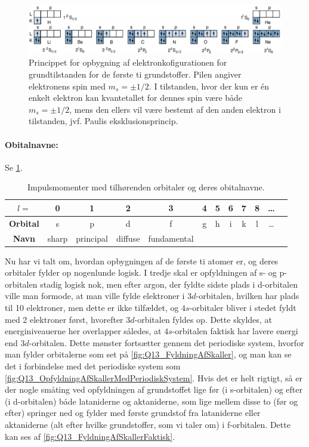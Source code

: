 \begin{figure}[!h]
    \centering
    \includegraphics[width=\textwidth]{Q13/images/FirstTwoShellsElectronicSpinConfiguration.PNG}
    \caption{Princippet for opbygning af elektronkofigurationen for grundtilstanden for de første ti grundstoffer. Pilen angiver elektronens spin med $m_s = \pm 1/2$. I tilstanden, hvor der kun er én enkelt elektron kan kvantetallet for dennes spin være både $m_s = \pm 1/2$, mens den ellers vil være bestemt af den anden elektron i tilstanden, jvf. Paulis eksklusionsprincip.}
    \label{fig:Q13_FyldningAfDeInderstseToSkaller}
\end{figure}

\paragraph{Obitalnavne:} Se \cref{tab:Q13_ImpulsmomenterOrbitalerOgDeresNavne}.
\begin{table}[!h]
    \centering
    \begin{tabular}{|c|c|c|c|c|c|c|c|c|c|c|c|}
        \hline
        $l=$ & 0 & 1 & 2 & 3 & 4 & 5 & 6 & 7 & 8 & \ldots\\
        \hline
        \textbf{Orbital} & s & p & d & f & g & h & i & k & l & \ldots \\
        \hline
        \textbf{Navn} & sharp & principal & diffuse & fundamental & & & & & &\\
        \hline
    \end{tabular}
    \caption{Impulsmomenter med tilhørenden orbitaler og deres obitalnavne.}
    \label{tab:Q13_ImpulsmomenterOrbitalerOgDeresNavne}
\end{table}

Nu har vi talt om, hvordan opbygningen af de første ti atomer er, og deres orbitaler fylder op nogenlunde logisk. I tredje skal er opfyldningen af s- og p-orbitalen stadig logisk nok, men efter argon, der fyldte sidste plads i d-orbitalen ville man formode, at man ville fylde elektroner i $3d$-orbitalen, hvilken har plads til 10 elektroner, men dette er ikke tilfældet, og $4s$-orbitaler bliver i stedet fyldt med 2 elektroner først, hvorefter $3d$-orbitalen fyldes op. Dette skyldes, at energiniveauerne her overlapper således, at $4s$-orbitalen faktisk har lavere energi end $3d$-orbitalen. Dette mønster fortsætter gennem det periodiske system, hvorfor man fylder orbitalerne som set på \cref{fig:Q13_FyldningAfSkaller}, og man kan se det i forbindelse med det periodiske system som \cref{fig:Q13_OpfyldningAfSkallerMedPeriodiskSystem}.
\noindent
Hvis det er helt rigtigt, så er der nogle småting ved opfyldningen af grundstoffet lige før (i s-orbitalen) og efter (i d-orbitalen) både lataniderne og aktaniderne, som lige mellem disse to (før og efter) springer ned og fylder med første grundstof fra lataniderne eller aktaniderne (alt efter hvilke grundstoffer, som vi taler om) i f-orbitalen. Dette kan ses af \cref{fig:Q13_FyldningAfSkallerFaktisk}.


